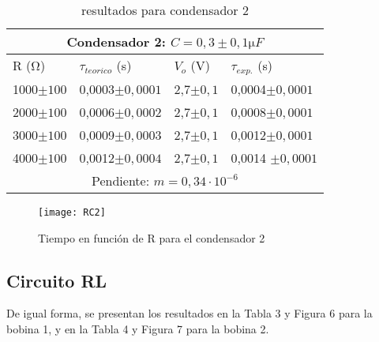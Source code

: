 \documentclass[a4paper,12pt,spanish]{article}
\begin{document}
\begin{table}[H]
	\centering
	\begin{tabular}{|llll|}
		\hline
		\multicolumn{4}{|c|}{Condensador 2: $C = 0,3\pm 0,1 \si{\micro F}$}                                                       \\ \hline
		\multicolumn{1}{|l|}{R ($\si{\ohm}$)}    & \multicolumn{1}{l|}{$\tau_{teorico}$ (s)} & \multicolumn{1}{l|}{$V_o$ (V)} & $\tau_{exp.}$ (s) \\ \hline
		\multicolumn{1}{|l|}{1000$\pm100$} & \multicolumn{1}{l|}{0,0003$\pm 0,0001$}      & \multicolumn{1}{l|}{2,7$\pm 0,1$}   & 0,0004$\pm 0,0001$           \\ \hline
		\multicolumn{1}{|l|}{2000$\pm100$} & \multicolumn{1}{l|}{0,0006$\pm 0,0002$}      & \multicolumn{1}{l|}{2,7$\pm 0,1$}   & 0,0008$\pm 0,0001$           \\ \hline
		\multicolumn{1}{|l|}{3000$\pm100$} & \multicolumn{1}{l|}{0,0009$\pm 0,0003$}      & \multicolumn{1}{l|}{2,7$\pm 0,1$}   & 0,0012$\pm 0,0001$           \\ \hline
		\multicolumn{1}{|l|}{4000$\pm100$} & \multicolumn{1}{l|}{0,0012$\pm 0,0004$}      & \multicolumn{1}{l|}{2,7$\pm 0,1$}   & 0,0014 $\pm 0,0001$          \\ \hline
		\multicolumn{4}{|c|}{Pendiente: $m = 0,34 \cdot 10^{-6}$}                                               \\ \hline
	\end{tabular}
	\caption{resultados para condensador 2}
	\label{tab:my-table}
\end{table}

\begin{figure}[H]
	\centering
	\texttt{[image: RC2]}
	\caption{Tiempo en función de R para el condensador 2}
	\label{fig:rc2}
\end{figure}




\subsection*{Circuito RL}

De igual forma, se presentan los resultados en la Tabla 3 y Figura 6 para la bobina 1, y en la Tabla 4 y Figura 7 para la bobina 2.
\end{document}
